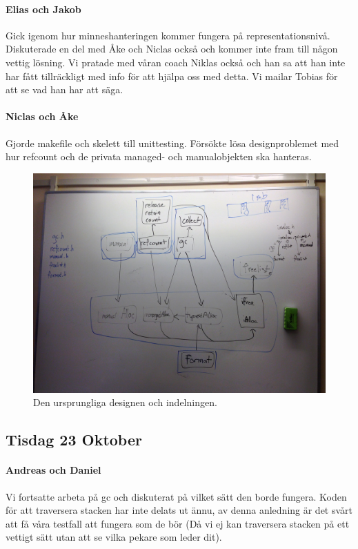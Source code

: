 \documentclass{article}
\begin{document}
\paragraph*{Elias och Jakob} Gick igenom hur minneshanteringen kommer fungera på representationsnivå. Diskuterade en del med Åke och Niclas också och kommer inte fram till någon vettig lösning. Vi pratade med våran coach Niklas också och han sa att han inte har fått tillräckligt med info för att hjälpa oss med detta. Vi mailar Tobias för att se vad han har att säga.

\paragraph*{Niclas och Åke} Gjorde makefile och skelett till unittesting. Försökte lösa designproblemet med hur refcount och de privata managed- och manualobjekten ska hanteras.


\begin{figure}[H]
  \includegraphics[width=\columnwidth]{images/design_whiteboard.jpg}
  \caption{Den ursprungliga designen och indelningen.}
  \label{fig:design}
\end{figure}

\subsection{Tisdag 23 Oktober}

\paragraph*{Andreas och Daniel} Vi fortsatte arbeta på gc och diskuterat på vilket sätt den borde fungera. Koden för att traversera stacken har inte delats ut ännu, av denna anledning är det svårt att få våra testfall att fungera som de bör (Då vi ej kan traversera stacken på ett vettigt sätt utan att se vilka pekare som leder dit).
\end{document}
